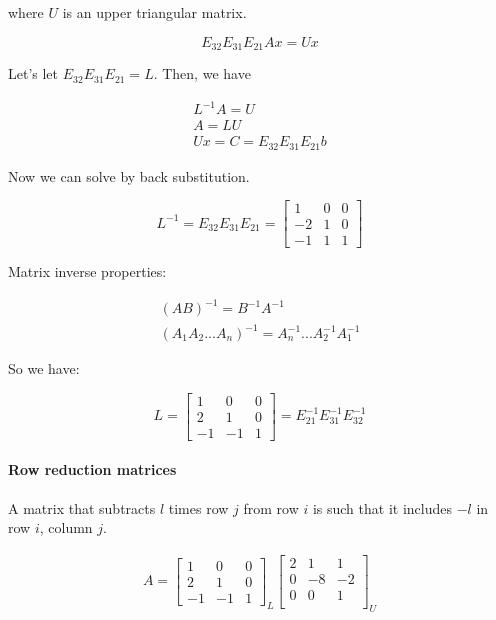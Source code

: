 \documentclass[12pt]{article}
\newcommand{\<}{\langle}
\renewcommand{\>}{\rangle}
\begin{document}
where $U$ is an upper triangular matrix.

\[
	E_{32}E_{31}E_{21}Ax = Ux
\]

Let's let $E_{32}E_{31}E_{21} = L$. Then, we have

\[
	\begin{matrix}
		L^{-1}A=U \\
		A = LU \\
		Ux = C = E_{32}E_{31}E_{21}b
	\end{matrix}
\]

Now we can solve by back substitution.

\[
	L^{-1}=E_{32}E_{31}E_{21} = \begin{bmatrix}
		1 & 0 & 0 \\
		-2 & 1 & 0 \\
		-1 & 1 & 1 
	\end{bmatrix}
\]


Matrix inverse properties:

\[
	\begin{matrix}
		(AB)^{-1} = B^{-1}A^{-1} \\
		(A_1A_2...A_n)^{-1} = A_n^{-1}...A_2^{-1}A_1^{-1}
	\end{matrix}
\]

So we have:

\[
	L = \begin{bmatrix}
		1 & 0 & 0 \\
		2 & 1 & 0 \\
		-1 & -1 & 1
	\end{bmatrix} = E_{21}^{-1}E_{31}^{-1}E_{32}^{-1}
\]

\paragraph{Row reduction matrices} A matrix that subtracts $l$ times row $j$ from row $i$ is such that it includes $-l$ in row $i$, column $j$.

\[
	\begin{matrix}
			A = \begin{bmatrix}
		1 & 0 & 0 \\
		2 & 1 & 0 \\
		-1 & -1 & 1
	\end{bmatrix}_L
	\begin{bmatrix}
		2 & 1 & 1 \\
		0 & -8 & -2 \\
		0 & 0 & 1 \\
	\end{bmatrix}_U
	\end{matrix}
\]
\end{document}
